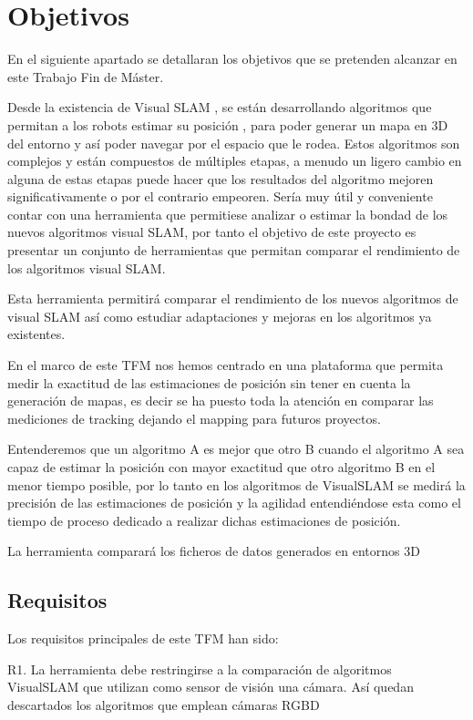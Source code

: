 \section{Objetivos} \label{s:objeticos}
\setcounter{page}{1}


En el siguiente apartado se detallaran los objetivos que se pretenden alcanzar en este Trabajo Fin de Máster.

Desde la existencia de Visual SLAM , se están desarrollando algoritmos que permitan a los robots estimar su posición , para poder generar un mapa en 3D del entorno y así poder navegar por el espacio que le rodea. Estos algoritmos son complejos y están compuestos de múltiples etapas, a menudo un ligero cambio en alguna de estas etapas puede hacer que los resultados del algoritmo mejoren significativamente o por el contrario empeoren. Sería muy útil y conveniente contar con una herramienta que permitiese analizar o estimar la bondad de los nuevos algoritmos visual SLAM, por tanto el objetivo de este proyecto es presentar un conjunto de herramientas que permitan comparar el rendimiento de los algoritmos visual SLAM.

Esta herramienta permitirá comparar el rendimiento de los nuevos algoritmos de visual SLAM así como estudiar adaptaciones y mejoras en los algoritmos ya existentes.

En el marco de este TFM nos hemos centrado en una plataforma que permita medir la exactitud de las estimaciones de posición sin tener en cuenta la generación de mapas, es decir se ha puesto toda la atención en comparar las mediciones de tracking dejando el mapping para futuros proyectos. 

Entenderemos que un algoritmo A es mejor que otro B cuando el algoritmo A sea capaz de estimar la posición con mayor exactitud que otro algoritmo B en el menor tiempo posible, por lo tanto en los algoritmos de VisualSLAM se medirá la precisión de las estimaciones de posición y la agilidad entendiéndose esta como el tiempo de proceso dedicado a realizar dichas estimaciones de posición. 

La herramienta comparará los ficheros de datos generados en entornos 3D

\subsection {Requisitos}

Los requisitos principales de este TFM han sido:

	R1. La herramienta debe restringirse a la comparación de algoritmos VisualSLAM que utilizan como sensor de visión una cámara. Así quedan descartados los algoritmos que emplean cámaras RGBD

